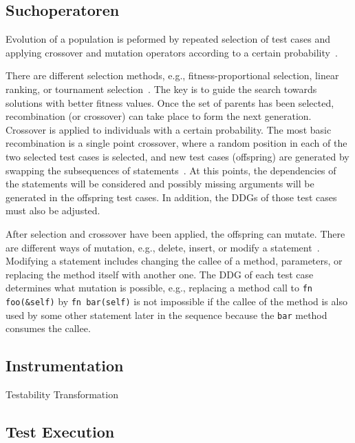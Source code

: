 \documentclass{article}
\begin{document}
\subsection{Suchoperatoren}
Evolution of a population is peformed by repeated selection of test cases and applying crossover and mutation operators according to a certain probability~\cite{Fraser2012}.

There are different selection methods, e.g., fitness-proportional selection, linear ranking, or tournament selection~\cite{McMinn_2004}. The key is to guide the search towards solutions with better fitness values. Once the set of parents has been selected, recombination (or crossover) can take place to form the next generation. Crossover is applied to individuals with a certain probability. The most basic recombination is a single point crossover, where a random position in each of the two selected test cases is selected, and new test cases (offspring) are generated by swapping the subsequences of statements~\cite{Fraser2012}. At this points, the dependencies of the statements will be considered and possibly missing arguments will be generated in the offspring test cases. In addition, the \acp{DDG} of those test cases must also be adjusted.

After selection and crossover have been applied, the offspring can mutate. There are different ways of mutation, e.g., delete, insert, or modify a statement~\cite{Fraser2012}. Modifying a statement includes changing the callee of a method, parameters, or replacing the method itself with another one. The \ac{DDG} of each test case determines what mutation is possible, e.g., replacing a method call to \lstinline{fn foo(&self)} by \lstinline{fn bar(self)} is not impossible if the callee of the method is also used by some other statement later in the sequence because the \lstinline{bar} method consumes the callee. 



\subsection{Instrumentation}
Testability Transformation~\cite{McMinn2011,McMinn2009}


\subsection{Test Execution}
\end{document}
